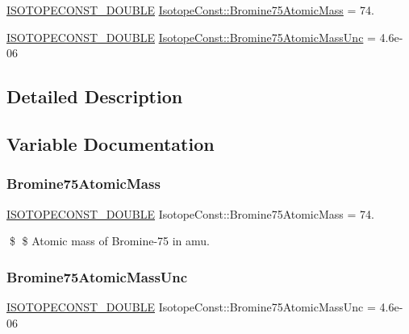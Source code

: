 \begin{DoxyCompactItemize}
\item 
\mbox{\hyperlink{group___isotope_const-_macros_ga8f45a7272ce02c0b4c65c44636ed719a}{I\+S\+O\+T\+O\+P\+E\+C\+O\+N\+S\+T\+\_\+\+D\+O\+U\+B\+LE}} \mbox{\hyperlink{group___isotope_const-_bromine-_br75_ga87e58ab54b95bf8eba07da11f1c4cd02}{Isotope\+Const\+::\+Bromine75\+Atomic\+Mass}} = 74.
\item 
\mbox{\hyperlink{group___isotope_const-_macros_ga8f45a7272ce02c0b4c65c44636ed719a}{I\+S\+O\+T\+O\+P\+E\+C\+O\+N\+S\+T\+\_\+\+D\+O\+U\+B\+LE}} \mbox{\hyperlink{group___isotope_const-_bromine-_br75_gae4fa280fda1141ce7fa88b99a71c699a}{Isotope\+Const\+::\+Bromine75\+Atomic\+Mass\+Unc}} = 4.\+6e-\/06
\end{DoxyCompactItemize}


\subsection{Detailed Description}


\subsection{Variable Documentation}
\mbox{\label{group___isotope_const-_bromine-_br75_ga87e58ab54b95bf8eba07da11f1c4cd02}} 
\subsubsection{\texorpdfstring{Bromine75\+Atomic\+Mass}{Bromine75AtomicMass}}
{\footnotesize\ttfamily \mbox{\hyperlink{group___isotope_const-_macros_ga8f45a7272ce02c0b4c65c44636ed719a}{I\+S\+O\+T\+O\+P\+E\+C\+O\+N\+S\+T\+\_\+\+D\+O\+U\+B\+LE}} Isotope\+Const\+::\+Bromine75\+Atomic\+Mass = 74.}

\$ \$ Atomic mass of Bromine-\/75 in amu. \mbox{\label{group___isotope_const-_bromine-_br75_gae4fa280fda1141ce7fa88b99a71c699a}} 
\subsubsection{\texorpdfstring{Bromine75\+Atomic\+Mass\+Unc}{Bromine75AtomicMassUnc}}
{\footnotesize\ttfamily \mbox{\hyperlink{group___isotope_const-_macros_ga8f45a7272ce02c0b4c65c44636ed719a}{I\+S\+O\+T\+O\+P\+E\+C\+O\+N\+S\+T\+\_\+\+D\+O\+U\+B\+LE}} Isotope\+Const\+::\+Bromine75\+Atomic\+Mass\+Unc = 4.\+6e-\/06}

